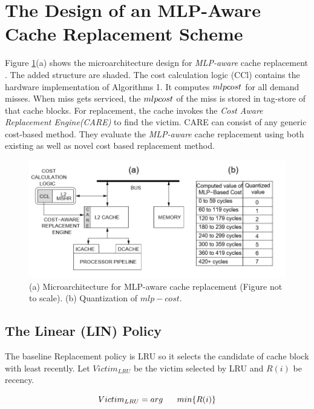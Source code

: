 \documentclass{report}
\begin{document}
\section{ The Design of an MLP-Aware Cache Replacement Scheme}
\vspace{.8cm}

Figure \ref{fig12}(a) shows the microarchitecture design for \emph{MLP-aware} cache replacement . The added structure are shaded. The cost calculation logic (CCl) contains the hardware implementation of Algorithms 1. It computes $mlp\-cost$ for all demand misses. When miss gets serviced, the $mlp\-cost$ of the miss is stored in tag-store of that cache blocks. For replacement, the cache invokes the \emph{Cost Aware Replacement Engine(CARE)} to find the victim. CARE can consist of any generic cost-based method. They evaluate the \emph{MLP-aware} cache replacement using both existing as well as novel cost based replacement method. 

\begin{figure}[h!]
\includegraphics[width=1\textwidth]{./fig12}
\caption{ (a) Microarchitecture for MLP-aware cache replacement (Figure not to scale). (b) Quantization of $mlp-cost$.}
\label{fig12}


\end{figure}

\subsection{ The Linear (LIN) Policy}

The baseline Replacement policy is LRU so it selects the candidate of cache block with least recently. Let $Victim_{LRU}$ be the victim selected by LRU and $R(i)$ be recency.

\begin{equation}
\vspace {1cm}
          Victim_{LRU} = arg \hspace*{.6cm} min \{ R(i) \}  
\end{equation}
\end{document}
